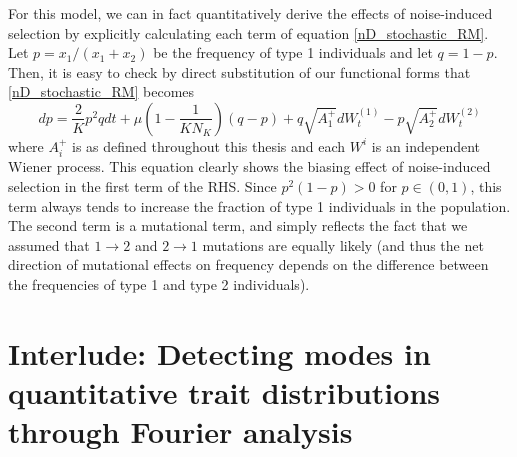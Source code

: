 For this model, we can in fact quantitatively derive the effects of noise-induced selection by explicitly calculating each term of equation \eqref{nD_stochastic_RM}. Let $p = x_1/(x_1 + x_2)$ be the frequency of type 1 individuals and let $q = 1-p$. Then, it is easy to check by direct substitution of our functional forms that \eqref{nD_stochastic_RM} becomes
\begin{equation}
	dp =  \frac{2}{K}p^2qdt + \mu\left(1-\frac{1}{KN_K}\right)\left(q-p\right) + q\sqrt{A^{+}_1}dW_t^{(1)} - p\sqrt{A^{+}_2}dW_t^{(2)}
\end{equation}
where $A_i^{+}$ is as defined throughout this thesis and each $W^{i}$ is an independent Wiener process. This equation clearly shows the biasing effect of noise-induced selection in the first term of the RHS. Since $p^2(1-p) > 0$ for $p \in (0,1)$, this term always tends to increase the fraction of type 1 individuals in the population. The second term is a mutational term, and simply reflects the fact that we assumed that $1 \to 2$ and $2 \to 1$ mutations are equally likely (and thus the net direction of mutational effects on frequency depends on the difference between the frequencies of type 1 and type 2 individuals).

\section{Interlude: Detecting modes in quantitative trait distributions through Fourier analysis}

